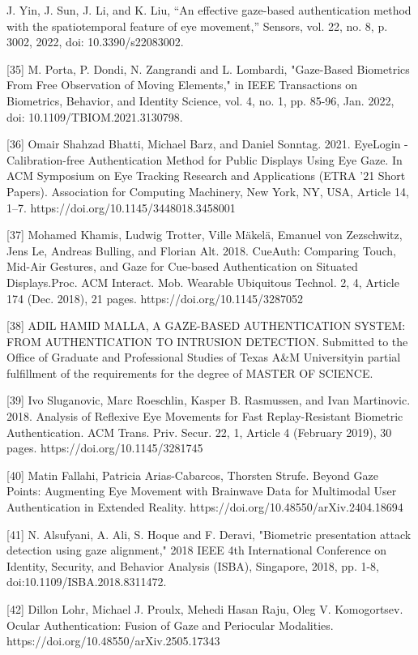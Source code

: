 \documentclass{article}
\begin{document}
\begin{raggedright}
[34] J. Yin, J. Sun, J. Li, and K. Liu, “An effective gaze-based authentication method with the spatiotemporal feature of eye movement,” Sensors, vol. 22, no. 8, p. 3002, 2022, doi: 10.3390/s22083002.

[35] M. Porta, P. Dondi, N. Zangrandi and L. Lombardi, "Gaze-Based Biometrics From Free Observation of Moving Elements," in IEEE Transactions on Biometrics, Behavior, and Identity Science, vol. 4, no. 1, pp. 85-96, Jan. 2022, doi: 10.1109/TBIOM.2021.3130798.

[36] Omair Shahzad Bhatti, Michael Barz, and Daniel Sonntag. 2021. EyeLogin - Calibration-free Authentication Method for Public Displays Using Eye Gaze. In ACM Symposium on Eye Tracking Research and Applications (ETRA '21 Short Papers). Association for Computing Machinery, New York, NY, USA, Article 14, 1–7. https://doi.org/10.1145/3448018.3458001

[37] Mohamed Khamis, Ludwig Trotter, Ville Mäkelä, Emanuel von Zezschwitz, Jens Le, Andreas Bulling, and Florian Alt. 2018. CueAuth: Comparing Touch, Mid-Air Gestures, and Gaze for Cue-based Authentication on Situated Displays.Proc. ACM Interact. Mob. Wearable Ubiquitous Technol. 2, 4, Article 174 (Dec. 2018), 21 pages. https://doi.org/10.1145/3287052

[38] ADIL HAMID MALLA, A GAZE-BASED AUTHENTICATION SYSTEM: FROM AUTHENTICATION TO INTRUSION DETECTION. Submitted to the Office of Graduate and Professional Studies of Texas A\&M Universityin partial fulfillment of the requirements for the degree of MASTER OF SCIENCE.

[39] Ivo Sluganovic, Marc Roeschlin, Kasper B. Rasmussen, and Ivan Martinovic. 2018. Analysis of Reflexive Eye Movements for Fast Replay-Resistant Biometric Authentication. ACM Trans. Priv. Secur. 22, 1, Article 4 (February 2019), 30 pages. https://doi.org/10.1145/3281745

[40] Matin Fallahi, Patricia Arias-Cabarcos, Thorsten Strufe. Beyond Gaze Points: Augmenting Eye Movement with Brainwave Data for Multimodal User Authentication in Extended Reality. https://doi.org/10.48550/arXiv.2404.18694

[41] N. Alsufyani, A. Ali, S. Hoque and F. Deravi, "Biometric presentation attack detection using gaze alignment," 2018 IEEE 4th International Conference on Identity, Security, and Behavior Analysis (ISBA), Singapore, 2018, pp. 1-8, doi:10.1109/ISBA.2018.8311472.

[42] Dillon Lohr, Michael J. Proulx, Mehedi Hasan Raju, Oleg V. Komogortsev. Ocular Authentication: Fusion of Gaze and Periocular Modalities.  https://doi.org/10.48550/arXiv.2505.17343


\end{raggedright}
\end{document}
